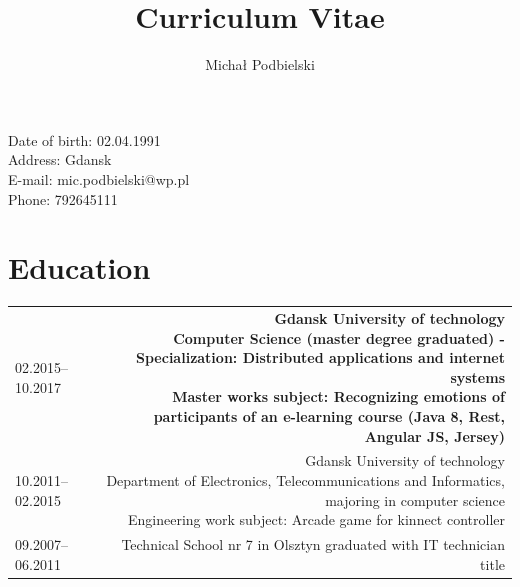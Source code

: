 \documentclass[1pt]{my_cv}
\title{\bfseries Curriculum Vitae}
\author{Michał Podbielski}
\date{}
\begin{document}
	\begin{minipage}{0.65\textwidth}
		\begingroup
		\let\center\flushleft
		\let\endcenter\endflushleft
		\maketitle
		\endgroup
	\end{minipage}
	\begin{minipage}{0.3\textwidth}
	\end{minipage}
	
	\begin{minipage}[ht]{0.48\textwidth}
		\vspace{-1cm}Date of birth: 02.04.1991\\
		Address:  Gdansk\\		
		E-mail:	mic.podbielski@wp.pl\\
		Phone: 792645111\\
	\end{minipage}
	
	\section*{Education}
	\begin{tabular}{L!{\VRule}R}
		02.2015--10.2017&{\bf Gdansk University of technology \newline Computer Science (master degree graduated) - Specialization: Distributed applications and internet systems\newline
		\bf	Master works subject: Recognizing emotions of participants of an e-learning course (Java 8, Rest, Angular JS, Jersey)}\\[5pt]
		10.2011--02.2015&{Gdansk University of technology\newline 
			Department of  Electronics, Telecommunications and Informatics, majoring in computer science\newline
			Engineering work subject: Arcade game for kinnect controller}\\
		09.2007--06.2011&{Technical School nr 7 in Olsztyn graduated with IT technician title}\\
	\end{tabular}
\end{document}
